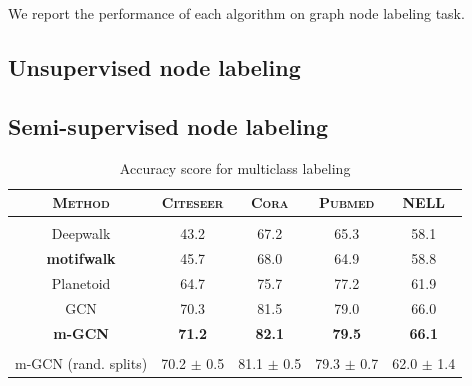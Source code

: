\documentclass{article}
\theoremstyle{definition}
\begin{document}
We report the performance of each algorithm on graph node
labeling task.

\subsection{Unsupervised node labeling}

\begin{table}
\centering
{}
\caption{F1-macro score for multiclass labeling}
\label{t:re}
\end{table}

\subsection{Semi-supervised node labeling}

\begin{table}
\centering
\begin{tabular}{c | c c c c}
\textbf{\textsc{Method}} & \textsc{Citeseer} & \textsc{Cora} & \textsc{Pubmed} & \textsc{NELL} \\
\hline \\
Deepwalk & 43.2 & 67.2 & 65.3 & 58.1 \\
\textbf{motifwalk} & 45.7 & 68.0 & 64.9 & 58.8 \\
Planetoid & 64.7 & 75.7 & 77.2 & 61.9 \\
GCN & 70.3 & 81.5 & 79.0 & 66.0 \\
\textbf{m-GCN} & \textbf{71.2} & \textbf{82.1} & \textbf{79.5} & \textbf{66.1} \\
\hline \\
m-GCN (rand. splits) & 70.2 $\pm$ 0.5 & 81.1 $\pm$ 0.5 & 79.3 $\pm$ 0.7 & 62.0 $\pm$ 1.4 \\
\end{tabular}%
\caption{Accuracy score for multiclass labeling}
\label{t:re}
\end{table}
\end{document}
